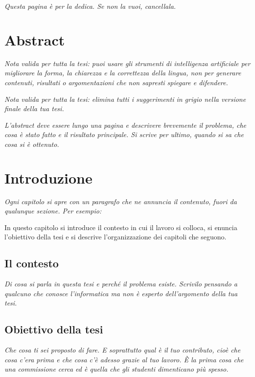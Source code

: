 \documentclass[12pt,a4paper,oneside]{report}
\newcommand{\guida}[1]{{\itshape\color{gray}#1\par}}
\newcommand{\esempio}[1]{#1\par}
\begin{document}


\thispagestyle{empty}
\guida{Questa pagina è per la dedica. Se non la vuoi, cancellala.}
\clearpage
\setcounter{page}{1}

\tableofcontents
\listoffigures
\listoftables

\chapter*{Abstract}
\guida{Nota valida per tutta la tesi: puoi usare gli strumenti di intelligenza artificiale per migliorare la forma, la chiarezza e la correttezza della lingua, non per generare contenuti, risultati o argomentazioni che non sapresti spiegare e difendere.}
\guida{Nota valida per tutta la tesi: elimina tutti i suggerimenti in grigio
nella versione finale della tua tesi.}
\guida{L'abstract deve essere lungo una pagina e descrivere brevemente il problema, che cosa è stato fatto e il risultato principale. Si scrive per ultimo, quando si sa che cosa si è ottenuto.}

\chapter{Introduzione}
\guida{Ogni capitolo si apre con un paragrafo che ne annuncia il contenuto,
fuori da qualunque sezione. Per esempio:}
\esempio{In questo capitolo si introduce il contesto in cui il lavoro si
colloca, si enuncia l'obiettivo della tesi e si descrive l'organizzazione dei
capitoli che seguono.}

\section{Il contesto}
\guida{Di cosa si parla in questa tesi e perché il problema esiste. Scrivilo pensando a qualcuno
che conosce l'informatica ma non è esperto dell'argomento della tua tesi.}

\section{Obiettivo della tesi}
\guida{Che cosa ti sei proposto di fare. E soprattutto qual è il tuo
contributo, cioè che cosa c'era prima e che cosa c'è adesso grazie al tuo
lavoro. È la prima cosa che una commissione cerca ed è quella che gli studenti
dimenticano più spesso.}
\end{document}

